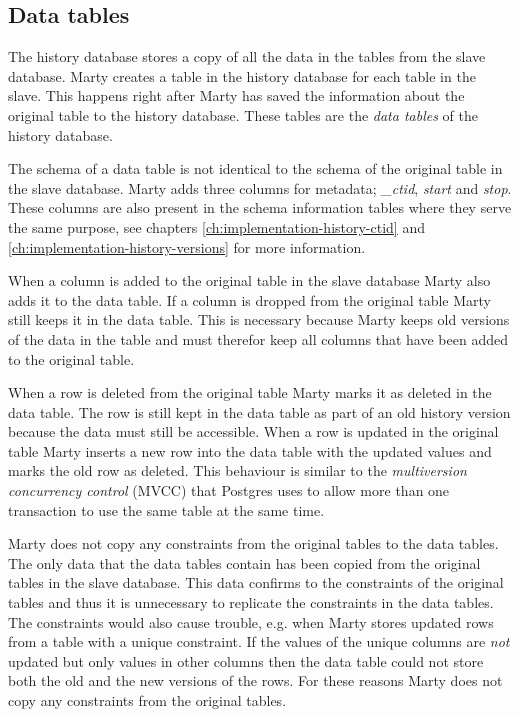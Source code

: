\subsection{Data tables}
The history database stores a copy of all the data in the tables from the slave database.
Marty creates a table in the history database for each table in the slave.
This happens right after Marty has saved the information about the original table to the history database.
These tables are the \textit{data tables} of the history database.

The schema of a data table is not identical to the schema of the original table in the slave database.
Marty adds three columns for metadata; \textit{\_ctid}, \textit{start} and \textit{stop}.
These columns are also present in the schema information tables where they serve the same purpose, see chapters \ref{ch:implementation-history-ctid} and \ref{ch:implementation-history-versions} for more information.

When a column is added to the original table in the slave database Marty also adds it to the data table.
If a column is dropped from the original table Marty still keeps it in the data table.
This is necessary because Marty keeps old versions of the data in the table and must therefor keep all columns that have been added to the original table.

When a row is deleted from the original table Marty marks it as deleted in the data table.
The row is still kept in the data table as part of an old history version because the data must still be accessible.
When a row is updated in the original table Marty inserts a new row into the data table with the updated values and marks the old row as deleted.
This behaviour is similar to the \textit{multiversion concurrency control} (MVCC) that Postgres uses to allow more than one transaction to use the same table at the same time.

Marty does not copy any constraints from the original tables to the data tables.
The only data that the data tables contain has been copied from the original tables in the slave database.
This data confirms to the constraints of the original tables and thus it is unnecessary to replicate the constraints in the data tables.
The constraints would also cause trouble, e.g. when Marty stores updated rows from a table with a unique constraint.
If the values of the unique columns are \textit{not} updated but only values in other columns then the data table could not store both the old and the new versions of the rows.
For these reasons Marty does not copy any constraints from the original tables.

